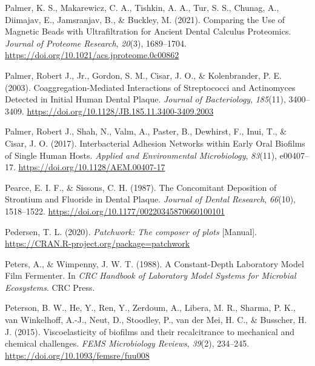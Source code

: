 \documentclass[
  letterpaper,
]{book}
\newlength{\cslhangindent}
\newlength{\cslentryspacingunit} %
\newenvironment{CSLReferences}[2] %
 {%
  \setlength{\parindent}{0pt}
  \ifodd #1
  \let\oldpar\par
  \def\par{\hangindent=\cslhangindent\oldpar}
  \fi
  \setlength{\parskip}{#2\cslentryspacingunit}
 }%
 {}
\begin{document}
\begin{CSLReferences}{1}{0}
\leavevmode{}%
Palmer, K. S., Makarewicz, C. A., Tishkin, A. A., Tur, S. S., Chunag,
A., Diimajav, E., Jamsranjav, B., \& Buckley, M. (2021). Comparing the
{Use} of {Magnetic Beads} with {Ultrafiltration} for {Ancient Dental
Calculus Proteomics}. \emph{Journal of Proteome Research}, \emph{20}(3),
1689--1704. \url{https://doi.org/10.1021/acs.jproteome.0c00862}

\leavevmode{}%
Palmer, Robert J., Jr., Gordon, S. M., Cisar, J. O., \& Kolenbrander, P.
E. (2003). Coaggregation-{Mediated Interactions} of {Streptococci} and
{Actinomyces Detected} in {Initial Human Dental Plaque}. \emph{Journal
of Bacteriology}, \emph{185}(11), 3400--3409.
\url{https://doi.org/10.1128/JB.185.11.3400-3409.2003}

\leavevmode{}%
Palmer, Robert J., Shah, N., Valm, A., Paster, B., Dewhirst, F., Inui,
T., \& Cisar, J. O. (2017). Interbacterial {Adhesion Networks} within
{Early Oral Biofilms} of {Single Human Hosts}. \emph{Applied and
Environmental Microbiology}, \emph{83}(11), e00407--17.
\url{https://doi.org/10.1128/AEM.00407-17}

\leavevmode{}%
Pearce, E. I. F., \& Sissons, C. H. (1987). The {Concomitant Deposition}
of {Strontium} and {Fluoride} in {Dental Plaque}. \emph{Journal of
Dental Research}, \emph{66}(10), 1518--1522.
\url{https://doi.org/10.1177/00220345870660100101}

\leavevmode{}%
Pedersen, T. L. (2020). \emph{Patchwork: {The} composer of plots}
{[}Manual{]}. \url{https://CRAN.R-project.org/package=patchwork}

\leavevmode{}%
Peters, A., \& Wimpenny, J. W. T. (1988). A {Constant-Depth Laboratory
Model Film Fermenter}. In \emph{{CRC Handbook} of {Laboratory Model
Systems} for {Microbial Ecosystems}}. {CRC Press}.

\leavevmode{}%
Peterson, B. W., He, Y., Ren, Y., Zerdoum, A., Libera, M. R., Sharma, P.
K., van Winkelhoff, A.-J., Neut, D., Stoodley, P., van der Mei, H. C.,
\& Busscher, H. J. (2015). Viscoelasticity of biofilms and their
recalcitrance to mechanical and chemical challenges. \emph{FEMS
Microbiology Reviews}, \emph{39}(2), 234--245.
\url{https://doi.org/10.1093/femsre/fuu008}


\end{CSLReferences}
\end{document}
